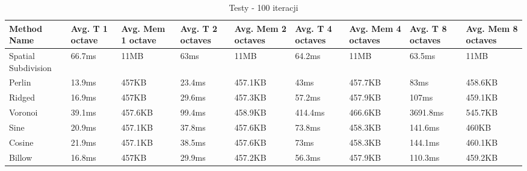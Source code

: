 \begin{table}[h]
\centering
\begin{tabularx}{1\textwidth}{ |>{\centering\arraybackslash}X||>{\centering\arraybackslash}X|>{\centering\arraybackslash}X|>{\centering\arraybackslash}X|>{\centering\arraybackslash}X|>{\centering\arraybackslash}X|>{\centering\arraybackslash}X|>{\centering\arraybackslash}X|>{\centering\arraybackslash}X|}
\hline
Method Name & Avg. T 1 octave & Avg. Mem 1 octave & Avg. T 2 octaves & Avg. Mem 2 octaves & Avg. T 4 octaves & Avg. Mem 4 octaves & Avg. T 8 octaves & Avg. Mem 8 octaves\\
\hline
\hline
Spatial Subdivision & 66.7ms & 11MB & 63ms & 11MB & 64.2ms & 11MB & 63.5ms & 11MB\\
\hline
Perlin & 13.9ms & 457KB & 23.4ms & 457.1KB & 43ms & 457.7KB & 83ms & 458.6KB\\
\hline
Ridged & 16.9ms & 457KB & 29.6ms & 457.3KB & 57.2ms & 457.9KB & 107ms & 459.1KB\\
\hline
Voronoi & 39.1ms & 457.6KB & 99.4ms & 458.9KB & 414.4ms & 466.6KB & 3691.8ms & 545.7KB\\
\hline
Sine & 20.9ms & 457.1KB & 37.8ms & 457.6KB & 73.8ms & 458.3KB & 141.6ms & 460KB\\
\hline
Cosine & 21.9ms & 457.1KB & 38.5ms & 457.6KB & 73ms & 458.3KB & 144.1ms & 460.1KB\\
\hline
Billow & 16.8ms & 457KB & 29.9ms & 457.2KB & 56.3ms & 457.9KB & 110.3ms & 459.2KB\\
\hline
\end{tabularx}
\caption{Testy - 100 iteracji}
\label{ table:tests_table}
\end{table}
